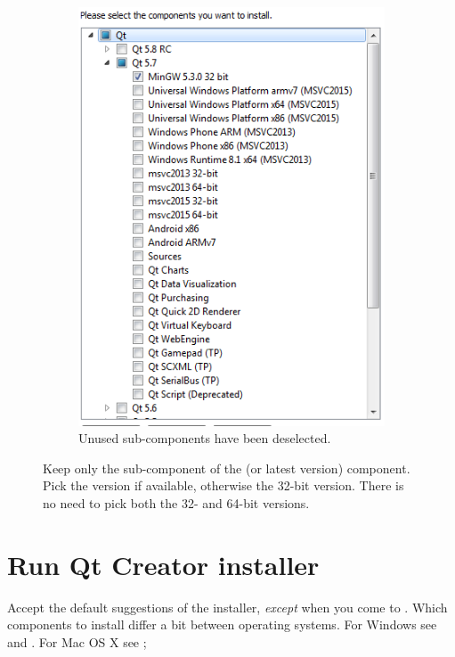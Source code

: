 \begin{figure} [h]
\begin{subfigure}{.5\textwidth}
  \includegraphics[width=.9\textwidth]{graphics/qt-setup-win-4.png}
  \caption{Unused sub-components have been deselected.}
\end{subfigure}%
\caption{Keep only the  sub-component of the  (or latest version) component. Pick the  version if available, otherwise the 32-bit version. There is no need to pick both the 32- and 64-bit versions.}
\label{fig:qt-setup-win-2}
\end{figure}

\FloatBarrier

\section{Run Qt Creator installer}

Accept the default suggestions of the installer, \emph{except} when you come to . Which components to install differ a bit between operating systems. For Windows see  and . For Mac OS X see ;

